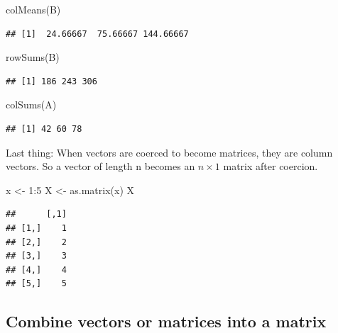 \documentclass[
]{book}
\newenvironment{Shaded}{\begin{snugshade}}{\end{snugshade}}
\newcommand{\DecValTok}[1]{\textcolor[rgb]{0.00,0.00,0.81}{#1}}
\newcommand{\FunctionTok}[1]{\textcolor[rgb]{0.00,0.00,0.00}{#1}}
\newcommand{\NormalTok}[1]{#1}
\newcommand{\OtherTok}[1]{\textcolor[rgb]{0.56,0.35,0.01}{#1}}
\newcommand{\SpecialCharTok}[1]{\textcolor[rgb]{0.00,0.00,0.00}{#1}}
\theoremstyle{definition}
\theoremstyle{definition}
\theoremstyle{definition}
\theoremstyle{definition}
\theoremstyle{remark}
\begin{document}
\begin{Shaded}
\begin{Highlighting}[]
\FunctionTok{colMeans}\NormalTok{(B)}
\end{Highlighting}
\end{Shaded}

\begin{verbatim}
## [1]  24.66667  75.66667 144.66667
\end{verbatim}

\begin{Shaded}
\begin{Highlighting}[]
\FunctionTok{rowSums}\NormalTok{(B)}
\end{Highlighting}
\end{Shaded}

\begin{verbatim}
## [1] 186 243 306
\end{verbatim}

\begin{Shaded}
\begin{Highlighting}[]
\FunctionTok{colSums}\NormalTok{(A)}
\end{Highlighting}
\end{Shaded}

\begin{verbatim}
## [1] 42 60 78
\end{verbatim}

Last thing: When vectors are coerced to become matrices, they are column vectors. So a vector of length n becomes an \(n \times 1\) matrix after coercion.

\begin{Shaded}
\begin{Highlighting}[]
\NormalTok{x }\OtherTok{\textless{}{-}} \DecValTok{1}\SpecialCharTok{:}\DecValTok{5}
\NormalTok{X }\OtherTok{\textless{}{-}} \FunctionTok{as.matrix}\NormalTok{(x)}
\NormalTok{X}
\end{Highlighting}
\end{Shaded}

\begin{verbatim}
##      [,1]
## [1,]    1
## [2,]    2
## [3,]    3
## [4,]    4
## [5,]    5
\end{verbatim}

\hypertarget{combine-vectors-or-matrices-into-a-matrix}{%
\subsection{Combine vectors or matrices into a matrix}\label{combine-vectors-or-matrices-into-a-matrix}}
\end{document}
